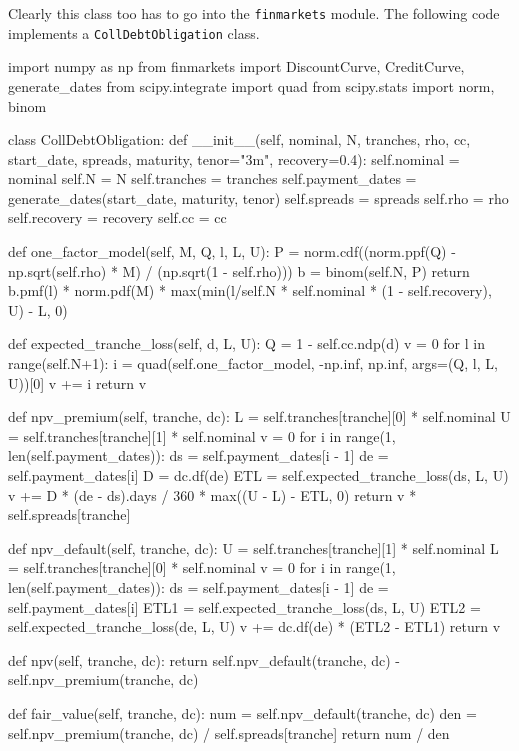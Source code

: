 \begin{finmarkets}
Clearly this class too has to go into the \texttt{finmarkets} module. The following code implements a \texttt{CollDebtObligation} class.
\end{finmarkets}

\begin{ipython}
import numpy as np
from finmarkets import DiscountCurve, CreditCurve, generate_dates
from scipy.integrate import quad
from scipy.stats import norm, binom

class CollDebtObligation:
    def __init__(self, nominal, N, tranches, rho, cc,
                 start_date, spreads, maturity, tenor="3m", recovery=0.4):
        self.nominal = nominal
        self.N = N
        self.tranches = tranches
        self.payment_dates = generate_dates(start_date, maturity, tenor)
        self.spreads = spreads
        self.rho = rho
        self.recovery = recovery
        self.cc = cc

    def one_factor_model(self, M, Q, l, L, U):
        P = norm.cdf((norm.ppf(Q) - np.sqrt(self.rho) * M) / (np.sqrt(1 - self.rho)))
        b = binom(self.N, P)
        return b.pmf(l) * norm.pdf(M) * max(min(l/self.N *
               self.nominal * (1 - self.recovery), U) - L, 0)

    def expected_tranche_loss(self, d, L, U):
        Q = 1 - self.cc.ndp(d)
        v = 0 
        for l in range(self.N+1):
            i = quad(self.one_factor_model, -np.inf, np.inf,
                args=(Q, l, L, U))[0]
            v += i
        return v

    def npv_premium(self, tranche, dc):
        L = self.tranches[tranche][0] * self.nominal
        U = self.tranches[tranche][1] * self.nominal
        v = 0
        for i in range(1, len(self.payment_dates)):
            ds = self.payment_dates[i - 1]
            de = self.payment_dates[i]
            D = dc.df(de)
            ETL = self.expected_tranche_loss(ds, L, U)
            v += D * (de - ds).days / 360 * max((U - L) - ETL, 0)
        return v * self.spreads[tranche]

    def npv_default(self, tranche, dc):
        U = self.tranches[tranche][1] * self.nominal
        L = self.tranches[tranche][0] * self.nominal
        v = 0
        for i in range(1, len(self.payment_dates)):
            ds = self.payment_dates[i - 1]
            de = self.payment_dates[i]
            ETL1 = self.expected_tranche_loss(ds, L, U)
            ETL2 = self.expected_tranche_loss(de, L, U)
            v += dc.df(de) * (ETL2 - ETL1)
        return v

    def npv(self, tranche, dc):
        return self.npv_default(tranche, dc) - self.npv_premium(tranche, dc)

    def fair_value(self, tranche, dc):
        num = self.npv_default(tranche, dc)
        den = self.npv_premium(tranche, dc) / self.spreads[tranche]
        return num / den
\end{ipython}

